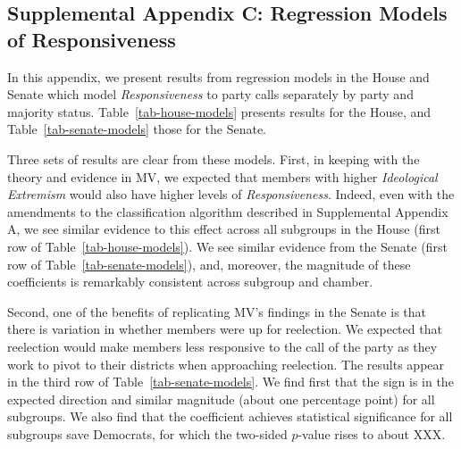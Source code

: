 \documentclass[12pt]{article}
\begin{document}
\clearpage

\subsection*{Supplemental Appendix C: Regression Models of Responsiveness}
%

In this appendix, we present results from regression models in the House and Senate which model \textit{Responsiveness} to party calls separately by party and majority status.  Table~\ref{tab-house-models} presents results for the House, and Table~\ref{tab-senate-models} those for the Senate.

Three sets of results are clear from these models. First, in keeping with the theory and evidence in MV, we expected that members with higher \textit{Ideological Extremism} would also have higher levels of \textit{Responsiveness}.  Indeed, even with the amendments to the classification algorithm described in Supplemental Appendix A, we see similar evidence to this effect across all subgroups in the House (first row of Table~\ref{tab-house-models}).  We see similar evidence from the Senate (first row of Table~\ref{tab-senate-models}), and, moreover, the magnitude of these coefficients is remarkably consistent across subgroup and chamber.

Second, one of the benefits of replicating MV's findings in the Senate is that there is variation in whether members were up for reelection.  We expected that reelection would make members less responsive to the call of the party as they work to pivot to their districts when approaching reelection.  The results appear in the third row of Table~\ref{tab-senate-models}.  We find first that the sign is in the expected direction and similar magnitude (about one percentage point) for all subgroups.  We also find that the coefficient achieves statistical significance for all subgroups save Democrats, for which the two-sided $p$-value rises to about XXX.

\end{document}
